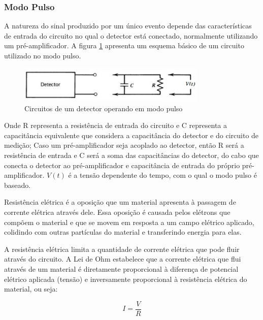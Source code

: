 \documentclass[11pt,a4paper]{article}
\begin{document}
		\subsubsection{Modo Pulso}

			A natureza do sinal produzido por um único evento depende das características de entrada do circuito no qual o detector está conectado, normalmente utilizando um pré-amplificador. A figura \ref{fig:esquemaModoPulso} apresenta um esquema básico de um circuito utilizado no modo pulso. 

				\begin{figure}[h]
					\centering
					\includegraphics[width=0.8\textwidth]{Imagens/esquemaModoPulso.jpg}
					\caption{Circuitos de um detector operando em modo pulso}
					\label{fig:esquemaModoPulso}
				\end{figure}

			\noindent Onde R representa a resistência de entrada do circuito e C representa a capacitância equivalente que considera a capacitância do detector e do circuito de medição; Caso um pré-amplificador seja acoplado ao detector, então R será a resistência de entrada e C será a soma das capacitâncias do detector, do cabo que conecta o detector ao pré-amplificador e capacitância de entrada do próprio pré-amplificador. $V(t)$ é a tensão dependente do tempo, com o qual o modo pulso é baseado. 

			Resistência elétrica é a oposição que um material apresenta à passagem de corrente elétrica através dele. Essa oposição é causada pelos elétrons que compõem o material e que se movem em resposta a um campo elétrico aplicado, colidindo com outras partículas do material e transferindo energia para elas. 

			A resistência elétrica limita a quantidade de corrente elétrica que pode fluir através do circuito. A Lei de Ohm estabelece que a corrente elétrica que flui através de um material é diretamente proporcional à diferença de potencial elétrico aplicada (tensão) e inversamente proporcional à resistência elétrica do material, ou seja:

				\begin{equation}
					I = \frac{V}{R}
				\end{equation}
\end{document}
